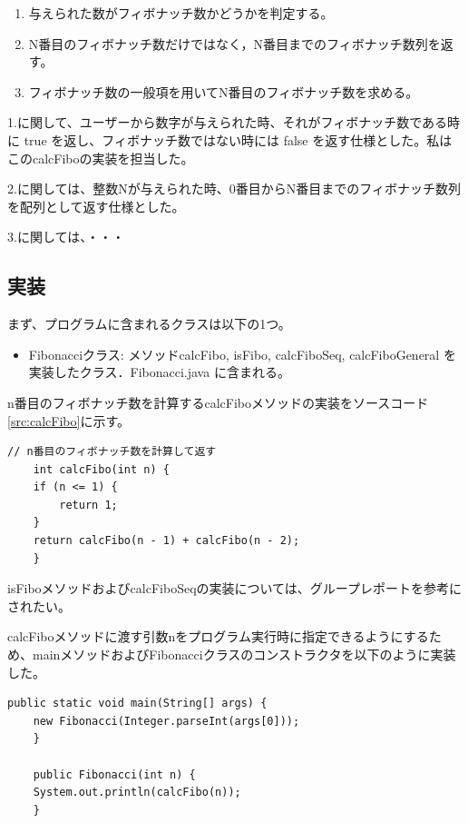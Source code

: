 \documentclass[a4j]{jarticle}
\begin{document}
\begin{enumerate}
\item 与えられた数がフィボナッチ数かどうかを判定する。
\item N番目のフィボナッチ数だけではなく，N番目までのフィボナッチ数列を返す。
\item フィボナッチ数の一般項を用いてN番目のフィボナッチ数を求める。
\end{enumerate}

1.に関して、ユーザーから数字が与えられた時、それがフィボナッチ数である時に true を返し、フィボナッチ数ではない時には false を返す仕様とした。私はこのcalcFiboの実装を担当した。

2.に関しては、整数Nが与えられた時、0番目からN番目までのフィボナッチ数列を配列として返す仕様とした。

3.に関しては、・・・
\subsection{実装}

まず、プログラムに含まれるクラスは以下の1つ。
\begin{itemize}
\item Fibonacciクラス: メソッドcalcFibo, isFibo, calcFiboSeq, calcFiboGeneral を実装したクラス．Fibonacci.java に含まれる。
\end{itemize}

n番目のフィボナッチ数を計算するcalcFiboメソッドの実装をソースコード\ref{src:calcFibo}に示す。

\begin{lstlisting}[caption=calcFiboメソッド,label=src:calcFibo]
    // n番目のフィボナッチ数を計算して返す
    int calcFibo(int n) {
	if (n <= 1) {
	    return 1;
	}
	return calcFibo(n - 1) + calcFibo(n - 2);
    }
\end{lstlisting}

isFiboメソッドおよびcalcFiboSeqの実装については、グループレポートを参考にされたい。

calcFiboメソッドに渡す引数nをプログラム実行時に指定できるようにするため、mainメソッドおよびFibonacciクラスのコンストラクタを以下のように実装した。
\begin{lstlisting}[caption=mainメソッドとコンストラクタ,label=src:main]
    public static void main(String[] args) {
	new Fibonacci(Integer.parseInt(args[0]));
    }

    public Fibonacci(int n) {
	System.out.println(calcFibo(n));
    }
\end{lstlisting}
\end{document}
